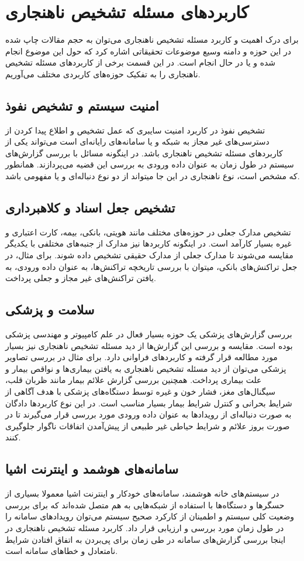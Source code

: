 \documentclass[12pt,a4paper]{report}
\theoremstyle{definition}
\theoremstyle{definition}
\begin{document}
\section {کاربرد‌های مسئله تشخیص ناهنجاری}
برای درک اهمیت و کاربرد مسئله تشخیص ناهنجاری می‌توان به حجم مقالات چاپ شده در این حوزه و دامنه وسیع موضوعات تحقیقاتی اشاره کرد که حول این موضوع انجام شده و یا در حال انجام است. در این قسمت برخی از کاربرد‌های مسئله تشخیص ناهنجاری را به تفکیک حوزه‌های کاربردی مختلف می‌آوریم.

\subsection{امنیت سیستم و تشخیص نفوذ}
تشخیص نفوذ در کاربرد امنیت سایبری که عمل تشخیص و اطلاع پیدا کردن از دسترسی‌های غیر مجاز به شبکه و یا سامانه‌های رایانه‌ای است می‌تواند یکی از کاربرد‌های مسئله تشخیص ناهنجاری باشد. در اینگونه مسائل با بررسی گزارش‌های سیستم در طول زمان به عنوان داده ورودی به بررسی این قضیه می‌پردازند. همانطور که مشخص است، نوع  ناهنجاری در این جا میتواند از دو نوع دنباله‌ای و یا مفهومی باشد.

\subsection{تشخیص جعل اسناد و کلاهبرداری}
تشخیص مدارک جعلی در حوزه‌های مختلف مانند هویتی، بانکی، بیمه، کارت اعتباری و غیره بسیار کارآمد است. در اینگونه کاربردها نیز مدارک از جنبه‌های مختلفی با یکدیگر مقایسه می‌شوند تا مدارک جعلی از مدارک حقیقی تشخیص داده شوند. برای مثال، در جعل تراکنش‌های بانکی، میتوان با بررسی تاریخچه تراکنش‌ها، به عنوان داده ورودی، به یافتن تراکنش‌های غیر مجاز و جعلی پرداخت.

\subsection{سلامت و پزشکی}
بررسی گزارش‌های پزشکی یک حوزه بسیار فعال در علم کامپیوتر و مهندسی پزشکی بوده است. مقایسه و بررسی این گزارش‌ها از دید مسئله تشخیص ناهنجاری نیز بسیار مورد مطالعه قرار گرفته و کاربرد‌های فراوانی دارد. برای مثال در بررسی تصاویر پزشکی می‌توان از دید مسئله تشخیص ناهنجاری به یافتن بیماری‌ها و نواقص بیمار و علت بیماری پرداخت. همچنین بررسی 
گزارش علائم بیمار مانند ظربان قلب، سیگنال‌های مغز، فشار خون و غیره توسط دستگاه‌های پزشکی با هدف آگاهی از شرایط بحرانی و کنترل شرایط بیمار بسیار مناسب است. در این نوع کاربرد‌ها دادگان به صورت دنباله‌ای از رویداد‌ها به عنوان داده ورودی مورد بررسی قرار می‌گیرند تا در صورت بروز علائم و شرایط حیاطی غیر طبیعی از پیش‌آمدن اتفاقات ناگوار جلوگیری کنند.
\subsection{سامانه‌های هوشمد و اینترنت اشیا}
در سیستم‌های خانه هوشمند، سامانه‌های خودکار و اینترنت اشیا معمولا بسیاری از حسگر‌ها و دستگاه‌ها با استفاده از شبکه‌هایی به هم متصل شده‌اند که برای بررسی وضعیت کلی سیستم و اطمینان از کارکرد صحیح سیستم می‌توان رویداد‌های سامانه را در طول زمان مورد بررسی و ارزیابی قرار داد. کاربرد مسئله تشخیص ناهنجاری در اینجا بررسی گزارش‌های سامانه در طی زمان برای پی‌بردن به اتفاق افتادن شرایط نامتعادل و خطا‌های سامانه است.
\end{document}
